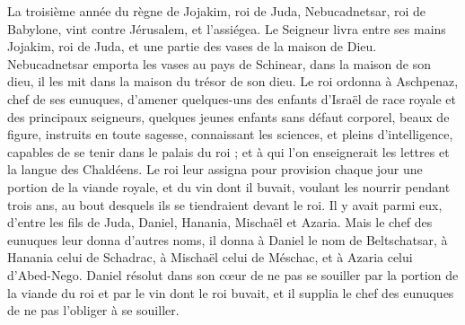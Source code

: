 \begin{multicols}{2}
\VerseOne{}La troisième année du règne de Jojakim, roi de Juda, Nebucadnetsar, roi de Babylone, vint contre Jérusalem, et l'assiégea.
Le Seigneur livra entre ses mains Jojakim, roi de Juda, et une partie des vases de la maison de Dieu. Nebucadnetsar emporta les vases au pays de Schinear, dans la maison de son dieu, il les mit dans la maison du trésor de son dieu.
Le roi ordonna à Aschpenaz, chef de ses eunuques, d’amener quelques-uns des enfants d'Israël de race royale  et des principaux seigneurs,
quelques jeunes enfants sans défaut corporel, beaux de figure, instruits en toute sagesse, connaissant les sciences, et pleins d'intelligence, capables de se tenir dans le palais du roi ; et à qui l’on enseignerait les lettres et la langue des Chaldéens.
Le roi leur assigna pour provision chaque jour une portion de la viande royale, et du vin dont il buvait, voulant les nourrir pendant trois ans, au bout desquels ils se tiendraient devant le roi.
Il y avait parmi eux, d’entre les fils de Juda, Daniel, Hanania, Mischaël et Azaria.
Mais le chef des eunuques leur donna d'autres noms, il donna à Daniel le nom de Beltschatsar, à Hanania celui de Schadrac, à Mischaël celui de Méschac, et à Azaria celui d'Abed-Nego.
Daniel résolut dans son cœur de ne pas se souiller par la portion de la viande du roi et par le vin dont le roi buvait,  et il supplia le chef des eunuques de ne pas l’obliger à se souiller.

\end{multicols}
